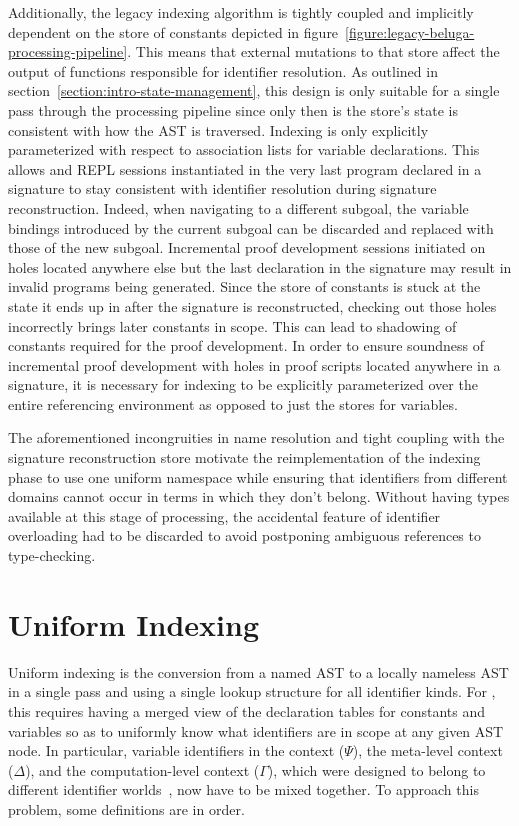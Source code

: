 Additionally, the legacy indexing algorithm is tightly coupled and implicitly dependent on the store of constants depicted in figure~\ref{figure:legacy-beluga-processing-pipeline}.
This means that external mutations to that store affect the output of functions responsible for identifier resolution.
As outlined in section~\ref{section:intro-state-management}, this design is only suitable for a single pass through the processing pipeline since only then is the store's state is consistent with how the \ac{AST} is traversed.
Indexing is only explicitly parameterized with respect to association lists for variable declarations.
This allows \Harpoon and \ac{REPL} sessions instantiated in the very last program declared in a \Beluga signature to stay consistent with identifier resolution during signature reconstruction.
Indeed, when navigating to a different \Harpoon subgoal, the variable bindings introduced by the current subgoal can be discarded and replaced with those of the new subgoal.
Incremental proof development sessions initiated on holes located anywhere else but the last declaration in the signature may result in invalid programs being generated.
Since the store of constants is stuck at the state it ends up in after the signature is reconstructed, checking out those holes incorrectly brings later constants in scope.
This can lead to shadowing of constants required for the proof development.
In order to ensure soundness of incremental proof development with holes in proof scripts located anywhere in a signature, it is necessary for indexing to be explicitly parameterized over the entire referencing environment as opposed to just the stores for variables.

The aforementioned incongruities in name resolution and tight coupling with the signature reconstruction store motivate the reimplementation of the indexing phase to use one uniform namespace while ensuring that identifiers from different domains cannot occur in terms in which they don't belong.
Without having types available at this stage of processing, the accidental feature of identifier overloading had to be discarded to avoid postponing ambiguous references to type-checking.

\section{Uniform Indexing}\label{section:indexing}


Uniform indexing is the conversion from a named \ac{AST} to a locally nameless \ac{AST} in a single pass and using a single lookup structure for all identifier kinds.
For \Beluga, this requires having a merged view of the declaration tables for constants and variables so as to uniformly know what identifiers are in scope at any given \ac{AST} node.
In particular, variable identifiers in the \LF context ($\Psi$), the meta-level context ($\Delta$), and the computation-level context ($\Gamma$), which were designed to belong to different identifier worlds~\cite{ferreira2012compiler}, now have to be mixed together.
To approach this problem, some definitions are in order.

